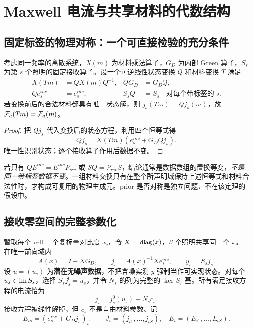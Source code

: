 \section{Maxwell 电流与共享材料的代数结构}

\subsection{固定标签的物理对称：一个可直接检验的充分条件}

考虑同一频率的离散系统，$X(m)$ 为材料乘法算子，$G_D$ 为内部 Green 算子，$S_s$ 为第 $s$ 个照明的固定接收算子。设一个可逆线性状态变换 $Q$ 和材料变换 $T$ 满足
\begin{align}
X(Tm)&=QX(m)Q^{-1}, & QG_D&=G_DQ,\\
Qe_s^{inc}&=e_s^{inc}, & S_sQ&=S_s \quad\text{对每个带标签的 }s.
\end{align}
若变换前后的合法材料都具有唯一状态解，则 $j_s(Tm)=Qj_s(m)$，故 ${\mathcal F_a}(Tm)={\mathcal F_a}(m)$。
\begin{proof}
把 $Qj_s$ 代入变换后的状态方程，利用四个恒等式得
\[
Qj_s=X(Tm)(e_s^{inc}+G_DQj_s).
\]
唯一性识别状态；逐个接收算子作用后数据不变。
\end{proof}

若只有 $QE^{inc}=E^{inc}P_{src}$ 或 $SQ=P_{rec}S$，结论通常是数据数组的置换等变，\emph{不是同一带标签数据不变}。一组材料交换只有在整个所声明域保持上述恒等式和材料合法性时，才构成可复用的物理生成元。prior 是否对称是独立问题，不在该定理的假设中。

\subsection{接收零空间的完整参数化}

暂取每个 cell 一个复标量对比度 $x_i$，令 $X=\operatorname{diag}(x)$，$S$ 个照明共享同一个 $x$。在唯一前向域内
\begin{equation}
A(x)=I-XG_D,\qquad
j_s=A(x)^{-1}Xe_s^{inc},\qquad y_s=S_sj_s.
\end{equation}
设 $u=(u_s)$ 为\textbf{潜在无噪声数据}，不把含噪实测 $y$ 强制当作可实现状态。对每个 $u_s\in\operatorname{im} S_s$，选择 $S_sj_s^0=u_s$，并令 $N_s$ 的列为完整的 $\ker S_s$ 基。所有满足接收方程的电流恰为
\begin{equation}
j_s=j_s^0(u_s)+N_sc_s.\label{eq:current-param}
\end{equation}
接收方程被线性解掉，但 $c_s$ 不是自由材料参数。记
\begin{equation}
E_{is}=\left(e_s^{inc}+G_Dj_s\right)_i,\qquad
J_i=(j_{i1},\ldots,j_{iS}),\quad E_i=(E_{i1},\ldots,E_{iS}).
\end{equation}


